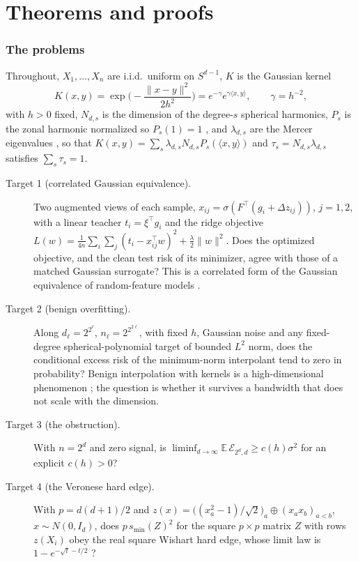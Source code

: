 \documentclass[11pt]{article}
\theoremstyle{definition}
\newcommand{\E}{\mathbb{E}}
\newcommand{\Sph}{S^{d-1}}
\begin{document}
\part{Theorems and proofs}

\section{The problems}\label{sec:four}

Throughout, $X_1,\dots,X_n$ are i.i.d.\ uniform on $\Sph$, $K$ is the Gaussian kernel
\[
K(x,y) = \exp\!\Big(-\frac{\|x-y\|^2}{2h^2}\Big) = e^{-\gamma}e^{\gamma\langle x,y\rangle},
\qquad \gamma = h^{-2},
\]
with $h>0$ fixed, $N_{d,s}$ is the dimension of the degree-$s$ spherical harmonics, $P_s$ is the
zonal harmonic normalized so $P_s(1)=1$ \cite{AtkinsonHan}, and $\lambda_{d,s}$ are the Mercer
eigenvalues \cite{MinhNiyogiYao}, so that
$K(x,y)=\sum_s \lambda_{d,s}N_{d,s}P_s(\langle x,y\rangle)$ and $\tau_s = N_{d,s}\lambda_{d,s}$
satisfies $\sum_s \tau_s = 1$.

\begin{description}
\item[Target 1 (correlated Gaussian equivalence).] Two augmented views of each sample,
$x_{ij}=\sigma(F^\top(g_i+\Delta z_{ij}))$, $j=1,2$, with a linear teacher $t_i=\xi^\top g_i$ and the
ridge objective $L(w)=\frac1{4n}\sum_i\sum_j(t_i-x_{ij}^\top w)^2+\frac\lambda2\|w\|^2$. Does the
optimized objective, and the clean test risk of its minimizer, agree with those of a matched
Gaussian surrogate? This is a correlated form of the Gaussian equivalence of random-feature models
\cite{Goldt,HuLu,MeiMontanari}.
\item[Target 2 (benign overfitting).] Along $d_\ell=2^{2^\ell}$, $n_\ell=2^{2^{2\ell}}$, with fixed
$h$, Gaussian noise and any fixed-degree spherical-polynomial target of bounded $L^2$ norm, does the
conditional excess risk of the minimum-norm interpolant tend to zero in probability? Benign
interpolation with kernels is a high-dimensional phenomenon
\cite{LiangRakhlin,RakhlinZhai,Bartlett,Ghorbani,Mallinar}; the question is whether it survives a
bandwidth that does not scale with the dimension.
\item[Target 3 (the obstruction).] With $n=2^d$ and zero signal, is
$\liminf_{d\to\infty}\E\,\mathcal{E}_{2^d,d}\ge c(h)\sigma^2$ for an explicit $c(h)>0$?
\item[Target 4 (the Veronese hard edge).] With $p=d(d+1)/2$ and
$z(x)=\big((x_a^2-1)/\sqrt2\big)_a\oplus(x_ax_b)_{a<b}$, $x\sim N(0,I_d)$, does $p\,s_{\min}(Z)^2$
for the square $p\times p$ matrix $Z$ with rows $z(X_i)$ obey the real square Wishart hard edge, whose
limit law is $1-e^{-\sqrt t-t/2}$ \cite{Edelman,TracyWidom}?
\end{description}
\end{document}
